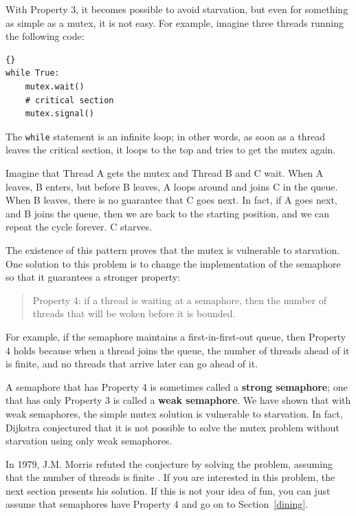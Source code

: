 \documentclass{book}
\begin{document}
With Property 3, it becomes possible to avoid starvation, but
even for something as simple as a mutex, it is not easy.
For example, imagine three threads
running the following code:

\begin{latin}
\begin{latin}
\begin{lstlisting}[title={Mutex loop}]{}
while True:
    mutex.wait()
    # critical section 
    mutex.signal()
\end{lstlisting}
\end{latin}
\end{latin}

The {\tt while} statement is an infinite loop; in other words,
as soon as a thread leaves the critical section, it loops to the
top and tries to get the mutex again.

Imagine that Thread A gets the mutex and Thread B and C wait.
When A leaves, B enters, but before B leaves, A loops around
and joins C in the queue.  When B leaves, there is no guarantee
that C goes next.  In fact, if A goes next, and B joins the
queue, then we are back to the starting position, and we can
repeat the cycle forever.  C starves.

The existence of this pattern proves that the mutex is
vulnerable to starvation.  One solution to this problem is
to change the implementation of the semaphore so that it
guarantees a stronger property:

\begin{quote}
Property 4: if a thread is waiting at a semaphore, then the
number of threads that will be woken before it is bounded.
\end{quote}

For example, if the semaphore maintains a first-in-first-out
queue, then Property 4 holds because when a thread joins the
queue, the number of threads ahead of it is finite, and
no threads that arrive later can go ahead of it.

A semaphore that has Property 4 is sometimes called a {\bf strong
semaphore}; one that has only Property 3 is called a {\bf weak
semaphore}.  We have shown that with weak semaphores, the simple mutex
solution is vulnerable to starvation.  In fact, Dijkstra conjectured
that it is not possible to solve the mutex problem without starvation
using only weak semaphores.

In 1979, J.M. Morris refuted the conjecture by solving the problem,
assuming that the number of threads is finite \cite{morris}.  If you
are interested in this problem, the next section presents his
solution.  If this is not your idea of fun, you can just assume that
semaphores have Property 4 and go on to Section~\ref{dining}.
\end{document}
